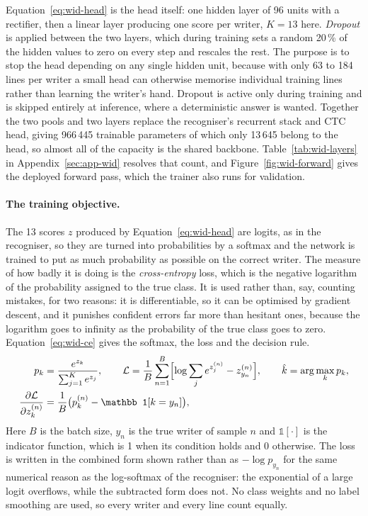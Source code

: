 Equation~\ref{eq:wid-head} is the head itself: one hidden layer of 96 units with a rectifier, then a linear layer producing one score per writer, $K=13$ here. \emph{Dropout} is applied between the two layers, which during training sets a random 20\,\% of the hidden values to zero on every step and rescales the rest. The purpose is to stop the head depending on any single hidden unit, because with only 63 to 184 lines per writer a small head can otherwise memorise individual training lines rather than learning the writer's hand. Dropout is active only during training and is skipped entirely at inference, where a deterministic answer is wanted. Together the two pools and two layers replace the recogniser's recurrent stack and CTC head, giving 966\,445 trainable parameters of which only 13\,645 belong to the head, so almost all of the capacity is the shared backbone. Table~\ref{tab:wid-layers} in Appendix~\ref{sec:app-wid} resolves that count, and Figure~\ref{fig:wid-forward} gives the deployed forward pass, which the trainer also runs for validation.

\paragraph{The training objective.}
The 13 scores $z$ produced by Equation~\ref{eq:wid-head} are logits, as in the recogniser, so they are turned into probabilities by a softmax and the network is trained to put as much probability as possible on the correct writer. The measure of how badly it is doing is the \emph{cross-entropy} loss, which is the negative logarithm of the probability assigned to the true class. It is used rather than, say, counting mistakes, for two reasons: it is differentiable, so it can be optimised by gradient descent, and it punishes confident errors far more than hesitant ones, because the logarithm goes to infinity as the probability of the true class goes to zero. Equation~\ref{eq:wid-ce} gives the softmax, the loss and the decision rule.
\begin{align}
p_k&=\frac{e^{z_k}}{\sum_{j=1}^{K}e^{z_j}},\qquad
\mathcal L=\frac1B\sum_{n=1}^B\Bigl[\log\sum_je^{z^{(n)}_j}-z^{(n)}_{y_n}\Bigr],\qquad\hat k=\arg\max_kp_k,\label{eq:wid-ce}\\
\frac{\partial\mathcal L}{\partial z^{(n)}_k}&=\frac{1}{B}\bigl(p^{(n)}_k-\mathbb 1[k=y_n]\bigr),\label{eq:wid-cebw}
\end{align}
Here $B$ is the batch size, $y_n$ is the true writer of sample $n$ and $\mathbb 1[\cdot]$ is the indicator function, which is 1 when its condition holds and 0 otherwise. The loss is written in the combined form shown rather than as $-\log p_{y_n}$ for the same numerical reason as the log-softmax of the recogniser: the exponential of a large logit overflows, while the subtracted form does not. No class weights and no label smoothing are used, so every writer and every line count equally.

